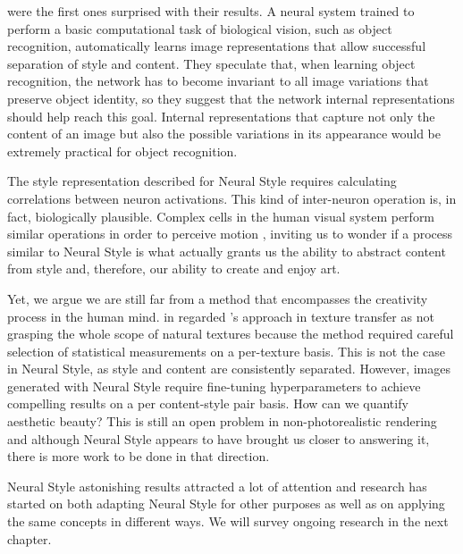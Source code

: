 \citeauthor{Gatys2015B} were the first ones surprised with their results.
A neural system trained to perform a basic computational task of biological vision, such as object recognition, automatically learns image representations that allow successful separation of style and content.
They speculate that, when learning object recognition, the network has to become invariant to all image variations that preserve object identity, so they suggest that the network internal representations should help reach this goal.
Internal representations that capture not only the content of an image but also the possible variations in its appearance would be extremely practical for object recognition.

The style representation described for Neural Style requires calculating correlations between neuron activations.
This kind of inter-neuron operation is, in fact, biologically plausible.
Complex cells in the human visual system perform similar operations in order to perceive motion \cite{Adelson1985}, inviting us to wonder if a process similar to Neural Style is what actually grants us the ability to abstract content from style and, therefore, our ability to create and enjoy art.

Yet, we argue we are still far from a method that encompasses the creativity process in the human mind.
\citeauthor{Gatys2015A} in \cite{Gatys2015A} regarded \citet{Portilla2000}'s approach in texture transfer as not grasping the whole scope of natural textures because the method required careful selection of statistical measurements on a per-texture basis.
This is not the case in Neural Style, as style and content are consistently separated.
However, images generated with Neural Style require fine-tuning hyperparameters to achieve compelling results on a per content-style pair basis.
How can we quantify aesthetic beauty? This is still an open problem in non-photorealistic rendering \cite{Kyprianidis2013} and although Neural Style appears to have brought us closer to answering it, there is more work to be done in that direction.

Neural Style astonishing results attracted a lot of attention and research has started on both adapting Neural Style for other purposes as well as on applying the same concepts in different ways.
We will survey ongoing research in the next chapter.
